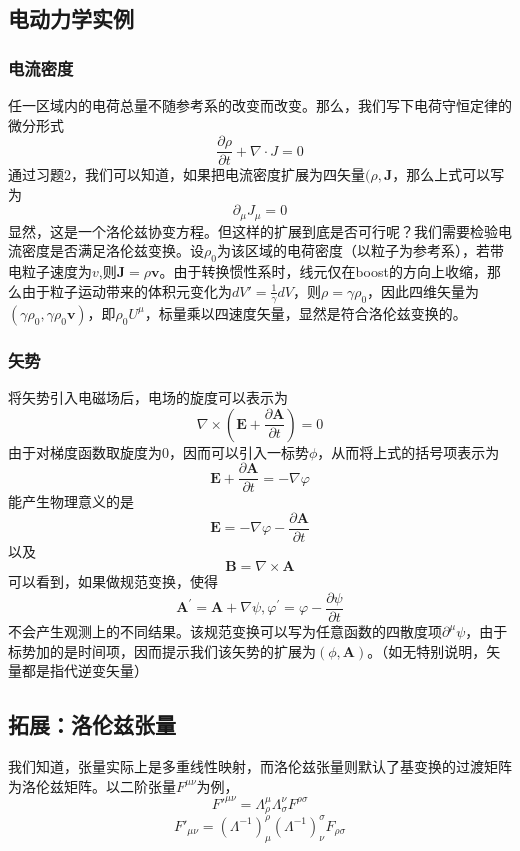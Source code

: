 \subsection{电动力学实例}
\subsubsection{电流密度}
任一区域内的电荷总量不随参考系的改变而改变。那么，我们写下电荷守恒定律的微分形式
\begin{equation}
\frac{\partial\rho}{\partial t}+\nabla \cdot J=0
\end{equation}
通过习题2，我们可以知道，如果把电流密度扩展为四矢量$(\rho,\boldsymbol{ J}$，那么上式可以写为
\begin{equation}
\partial_\mu J_\mu=0
\end{equation}
显然，这是一个洛伦兹协变方程。但这样的扩展到底是否可行呢？我们需要检验电流密度是否满足洛伦兹变换。设$\rho_0$为该区域的电荷密度（以粒子为参考系），若带电粒子速度为$v$,则$\boldsymbol{ J}=\rho \boldsymbol{ v}$。由于转换惯性系时，线元仅在boost的方向上收缩，那么由于粒子运动带来的体积元变化为$dV'=\frac{1}{\gamma}dV$，则$\rho=\gamma\rho_0$，因此四维矢量为$(\gamma\rho_0,\gamma\rho_0\boldsymbol{v})$，即$\rho_0U^\mu$，标量乘以四速度矢量，显然是符合洛伦兹变换的。
\subsubsection{矢势}
将矢势引入电磁场后，电场的旋度可以表示为
\begin{equation}
\nabla \times\left(\boldsymbol{E}+\frac{\partial \boldsymbol{A}}{\partial t}\right)=0
\end{equation}
由于对梯度函数取旋度为0，因而可以引入一标势$\phi$，从而将上式的括号项表示为
\begin{equation}
\boldsymbol{E}+\frac{\partial \boldsymbol{A}}{\partial t}=-\nabla \varphi
\end{equation}
能产生物理意义的是
\begin{equation}
\boldsymbol{E}=-\nabla \varphi-\frac{\partial \boldsymbol{A}}{\partial t}
\end{equation}以及
\begin{equation}
\boldsymbol{B}=\nabla \times \boldsymbol{A}
\end{equation}
可以看到，如果做规范变换，使得
\begin{equation}
\boldsymbol{A}^{\prime}=\boldsymbol{A}+\nabla \psi, 
\varphi^{\prime}=\varphi-\frac{\partial \psi}{\partial t}
\end{equation}
不会产生观测上的不同结果。该规范变换可以写为任意函数的四散度项$\partial^\mu \psi$，由于标势加的是时间项，因而提示我们该矢势的扩展为$(\phi,\boldsymbol A)$。（如无特别说明，矢量都是指代逆变矢量）
\subsection{拓展：洛伦兹张量}
我们知道，张量实际上是多重线性映射，而洛伦兹张量则默认了基变换的过渡矩阵为洛伦兹矩阵。以二阶张量$F^{\mu\nu} $为例，
\begin{equation}
F'^{\mu\nu}=\Lambda_\rho^\mu \Lambda_\sigma^\nu F^{\rho\sigma}  
\end{equation}
\begin{equation}
F'_{\mu\nu}=(\Lambda^{-1})_\mu^\rho (\Lambda^{-1})_\nu^\sigma F_{\rho\sigma}
\end{equation}


